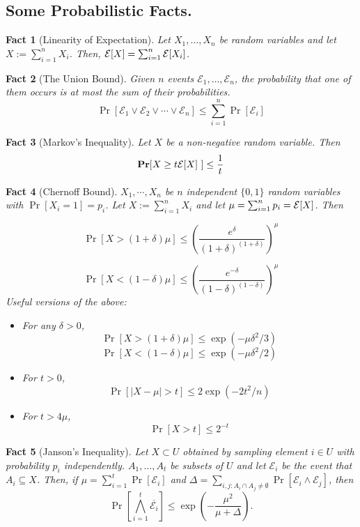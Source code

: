 \documentclass[11pt]{article}
\newtheorem{fact}{Fact}
\def\bar{\overline}
\begin{document}
\subsection*{Some Probabilistic Facts.}
\begin{fact}[Linearity of Expectation]
Let $X_1,\ldots,X_n$ be random variables and let $X := \sum_{i=1}^n X_i$. Then, 
$\E[X] = \sum_{i=1}^n \E[X_i]$.
\end{fact}
\vspace{2ex}
\def\Ev{{\mathcal E}}
\begin{fact}[The Union Bound]\label{fact:unionbound}
Given $n$ events $\Ev_1,\ldots,\Ev_n$, the probability that one of them occurs is at most
the sum of their probabilities.
$$\Pr[\Ev_1 \vee \Ev_2 \vee \cdots \vee \Ev_n] \le \sum_{i=1}^n \Pr[\Ev_i]$$
\end{fact}
\vspace{2ex}
\begin{fact}[Markov's Inequality]\label{fact:markov}
Let $X$ be a {\em non-negative} random variable. Then
$$\Pr[ X \ge t\E[X] ~] \le \frac{1}{t}$$
\end{fact}
\vspace{2ex}
\begin{fact}[Chernoff Bound]\label{fact:chernoff}
$X_1,\cdots,X_n$ be $n$ {\em independent} $\{0,1\}$ random variables with $\Pr[X_i = 1] = p_i$.
Let $X := \sum_{i=1}^n X_i$ and  let $\mu = \sum_{i=1}^n p_i = \E[X]$. Then

$$\Pr[X > (1 + \delta)\mu] \le \left( \frac{e^\delta}{(1+\delta)^{(1+\delta)}}\right)^\mu$$

$$\Pr[X < (1 - \delta)\mu] \le \left( \frac{e^{- \delta}}{(1 - \delta)^{(1 - \delta)}}\right)^\mu $$
\noindent
Useful versions of the above:
\begin{itemize}
\item For any $\delta > 0$,
$$\Pr[ X > (1+\delta)\mu] \le \exp( - \mu\delta^2/3 )$$ 
$$\Pr[ X < (1 - \delta)\mu] \le \exp( - \mu\delta^2/2 )$$
\item For $t > 0$,
$$ \Pr[|X - \mu| > t] \le 2\exp(-2t^2/n)$$
\item For $t > 4\mu$, 
$$\Pr[X > t] \le 2^{-t}$$
\end{itemize}
\end{fact}
\vspace{2ex}
\def\E{\mathcal E}
\begin{fact}[Janson's Inequality]\label{fact:janson}
Let $X\subset U$ obtained by sampling element $i\in U$ with probability $p_i$ independently.
$A_1,\ldots,A_t$ be subsets of $U$ and let $\E_i$ be the event that $A_i\subseteq X$.
Then, if $\mu = \sum_{i=1}^t \Pr[\E_i]$ and $\Delta = \sum_{i,j: A_i\cap A_j\neq \emptyset} \Pr[\E_i\wedge \E_j]$, then
$$\Pr[\bigwedge_{i=1}^t \bar{\E_i}] \le \exp\left( -\frac{\mu^2}{\mu + \Delta}\right).$$ 

\end{fact}
\end{document}
